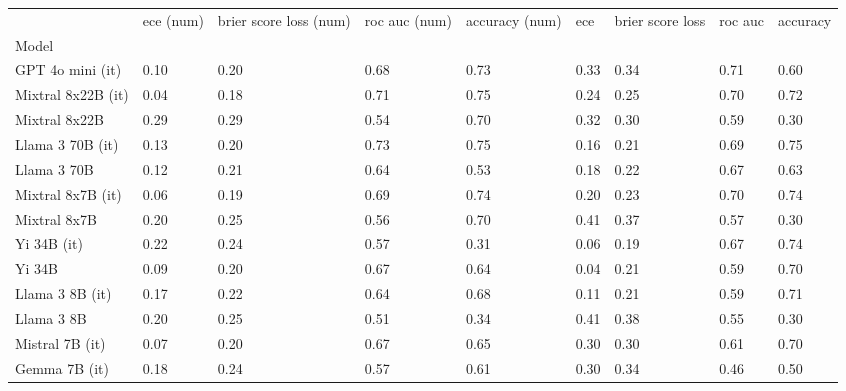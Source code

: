\begin{tabular}{lllllllll}
\toprule
 & ece (num) & brier score loss (num) & roc auc (num) & accuracy (num) & ece & brier score loss & roc auc & accuracy \\
Model &  &  &  &  &  &  &  &  \\
\midrule
GPT 4o mini (it) & 0.10 & 0.20 & 0.68 & \cellcolor{cyan!17.6} 0.73 & 0.33 & 0.34 & \cellcolor{cyan!25.0} 0.71 & 0.60 \\
Mixtral 8x22B (it) & \cellcolor{cyan!25.0} 0.04 & \cellcolor{cyan!25.0} 0.18 & \cellcolor{cyan!11.0} 0.71 & \cellcolor{cyan!25.0} 0.75 & 0.24 & 0.25 & \cellcolor{cyan!11.7} 0.70 & \cellcolor{cyan!12.7} 0.72 \\
Mixtral 8x22B & \cellcolor{orange!15.5} 0.29 & \cellcolor{orange!3.4} 0.29 & 0.54 & \cellcolor{cyan!0.5} 0.70 & 0.32 & 0.30 & 0.59 & \cellcolor{orange!25.0} 0.30 \\
Llama 3 70B (it) & 0.13 & 0.20 & \cellcolor{cyan!25.0} 0.73 & \cellcolor{cyan!24.4} 0.75 & 0.16 & \cellcolor{cyan!16.2} 0.21 & \cellcolor{cyan!7.0} 0.69 & \cellcolor{cyan!25.0} 0.75 \\
Llama 3 70B & 0.12 & 0.21 & 0.64 & 0.53 & 0.18 & \cellcolor{cyan!8.3} 0.22 & 0.67 & 0.63 \\
Mixtral 8x7B (it) & \cellcolor{cyan!0.3} 0.06 & \cellcolor{cyan!18.5} 0.19 & 0.69 & \cellcolor{cyan!22.2} 0.74 & 0.20 & \cellcolor{cyan!7.4} 0.23 & \cellcolor{cyan!12.7} 0.70 & \cellcolor{cyan!23.3} 0.74 \\
Mixtral 8x7B & 0.20 & 0.25 & 0.56 & 0.70 & 0.41 & 0.37 & 0.57 & \cellcolor{orange!25.0} 0.30 \\
Yi 34B (it) & 0.22 & 0.24 & 0.57 & \cellcolor{orange!25.0} 0.31 & \cellcolor{cyan!16.7} 0.06 & \cellcolor{cyan!25.0} 0.19 & 0.67 & \cellcolor{cyan!19.4} 0.74 \\
Yi 34B & 0.09 & 0.20 & 0.67 & 0.64 & \cellcolor{cyan!25.0} 0.04 & \cellcolor{cyan!17.2} 0.21 & 0.59 & \cellcolor{cyan!2.1} 0.70 \\
Llama 3 8B (it) & 0.17 & 0.22 & 0.64 & 0.68 & 0.11 & \cellcolor{cyan!12.7} 0.21 & 0.59 & \cellcolor{cyan!7.7} 0.71 \\
Llama 3 8B & 0.20 & 0.25 & 0.51 & \cellcolor{orange!6.2} 0.34 & 0.41 & 0.38 & 0.55 & \cellcolor{orange!25.0} 0.30 \\
Mistral 7B (it) & 0.07 & 0.20 & 0.67 & 0.65 & 0.30 & 0.30 & 0.61 & \cellcolor{cyan!0.4} 0.70 \\
Gemma 7B (it) & 0.18 & 0.24 & 0.57 & 0.61 & 0.30 & 0.34 & \cellcolor{orange!14.6} 0.46 & 0.50 \\

\end{tabular}
